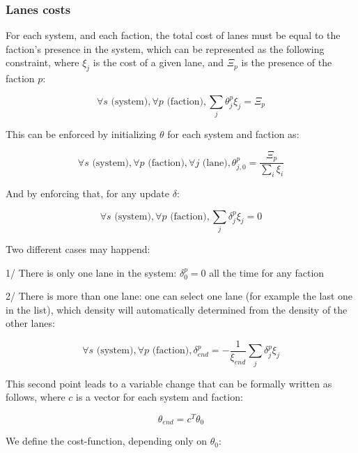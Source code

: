 \documentclass[11pt,a4paper]{article}		%
\begin{document}
\subsubsection{Lanes costs}

For each system, and each faction, the total cost of lanes must be equal to the faction's presence in the system, which can be represented as the following constraint, where $\xi_j$ is the cost of a given lane, and $\Xi_p$ is the presence of the faction $p$:

\begin{equation}
\forall s \text{ (system)}, \forall p \text{ (faction)}, \sum_j \theta_j^p \xi_j = \Xi_p
\end{equation}

This can be enforced by initializing $\theta$ for each system and faction as:

\begin{equation}
\forall s \text{ (system)}, \forall p \text{ (faction)}, \forall j \text{ (lane)}, \theta_{j,0}^p = \dfrac{\Xi_p}{\sum_i \xi_i}
\end{equation}

And by enforcing that, for any update $\delta$:

\begin{equation}
\forall s \text{ (system)}, \forall p \text{ (faction)}, \sum_j \delta_j^p \xi_j = 0
\end{equation}

Two different cases may happend:

1/ There is only one lane in the system: $\delta_0^p = 0$ all the time for any faction

2/ There is more than one lane: one can select one lane (for example the last one in the list), which density will automatically determined from the density of the other lanes:

\begin{equation}
\forall s \text{ (system)}, \forall p \text{ (faction)}, \delta_{end}^p = - \dfrac{1}{\xi_{end}} \sum_j \delta_j^p \xi_j
\end{equation}

This second point leads to a variable change that can be formally written as follows, where $c$ is a vector for each system and faction: 

\begin{equation}
\theta_{end} = c^T \theta_0
\end{equation}

We define the cost-function, depending only on $\theta_0$:
\end{document}

